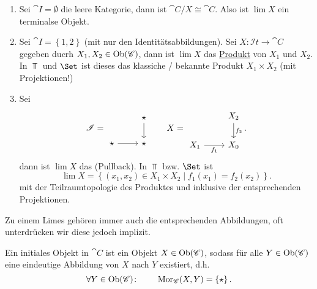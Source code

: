 \begin{example}
    \begin{enumerate}[1)]
        \item Sei $\cat{I} = \emptyset$ die leere Kategorie, dann ist $\cat{C} / X \cong \cat{C}$. Also ist $\lim X$ ein terminalse Objekt.
        \item Sei $\cat{I} = \left \{1,2\right\} $ (mit nur den Identitätsabbildungen). Sei $X\colon  \mathcal{I}t \to  \cat{C}$ gegeben ducrh $X_1,X_2\in \operatorname{Ob}(\mathscr{C})$, dann ist $\lim X$ das  \underline{Produkt} von $X_1$ und $X_2$. \\
            In $\Top$ und  $\Set$ ist dieses das klassiche / bekannte Produkt  $X_1\times X_2$ (mit Projektionen!)
        \item Sei 
            \[
            \cat{I} = 
            \begin{tikzcd}
                & \star \ar{d} \\
                \star \ar{r} & \star 
            \end{tikzcd}
            \qquad
            X = 
            \begin{tikzcd}
                & X_2 \ar{d}{f_2} \\
                X_1 \ar[swap]{r}{f_1} & X_0
            \end{tikzcd}
            .\] 
            dann ist $\lim X$ das   (Pullback). In $\Top$ bzw.  $\Set$ ist
             \[
                 \lim X = \left \{(x_1,x_2) \in  X_1\times X_2 \mid  f_1(x_1) = f_2(x_2)\right\} 
            .\] 
            mit der Teilraumtopologie des Produktes und inklusive der entsprechenden Projektionen.
    \end{enumerate}
\end{example}

\begin{oral}
    Zu einem Limes gehören immer auch die entsprechenden Abbildungen, oft unterdrücken wir diese jedoch implizit.
\end{oral}

\begin{definition}\label{def:initiales-objekt}
    Ein initiales Objekt in $\cat{C}$ ist ein Objekt $X\in \operatorname{Ob}(\mathscr{C})$, sodass für alle $Y\in \operatorname{Ob}(\mathscr{C})$ eine eindeutige Abbildung von $X$ nach  $Y$ existiert, d.h.
     \[
         \forall Y\in \operatorname{Ob}(\mathscr{C})\colon  \qquad \operatorname{Mor}_{\mathscr{C}}(X,Y) = \left \{\star\right\} 
    .\] 
\end{definition}

